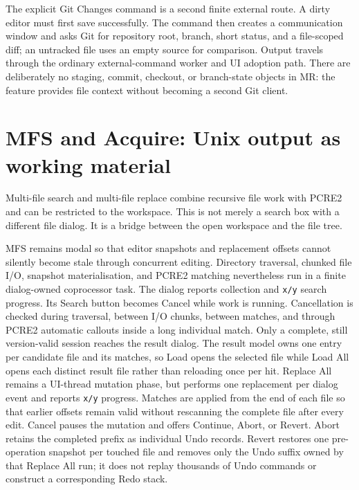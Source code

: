 \documentclass[a4paper,10pt,twoside,openany]{book}
\newcommand{\mr}{\textsc{MR}}
\begin{document}
The explicit Git Changes command is a second finite external route. A dirty
editor must first save successfully. The command then creates a communication
window and asks Git for repository root, branch, short status, and a
file-scoped diff; an untracked file uses an empty source for comparison.
Output travels through the ordinary external-command worker and UI adoption
path. There are deliberately no staging, commit, checkout, or branch-state
objects in \mr{}: the feature provides file context without becoming a second
Git client.

\chapter{MFS and Acquire: Unix output as working material}

Multi-file search and multi-file replace combine recursive file work with
PCRE2 and can be restricted to the workspace. This is not merely a search box
with a different file dialog. It is a bridge between the open workspace and
the file tree.

MFS remains modal so that editor snapshots and replacement offsets cannot
silently become stale through concurrent editing. Directory traversal, chunked
file I/O, snapshot materialisation, and PCRE2 matching nevertheless run in a
finite dialog-owned coprocessor task. The dialog reports collection and
\texttt{x/y} search progress. Its Search button becomes Cancel while work is
running. Cancellation is checked during traversal, between I/O chunks, between
matches, and through PCRE2 automatic callouts inside a long individual match.
Only a complete, still version-valid session reaches the result dialog.
The result model owns one entry per candidate file and its matches, so Load
opens the selected file while Load All opens each distinct result file rather
than reloading once per hit.
Replace All remains a UI-thread mutation phase, but performs one replacement
per dialog event and reports \texttt{x/y} progress. Matches are applied from
the end of each file so that earlier offsets remain valid without rescanning
the complete file after every edit. Cancel pauses the mutation and offers
Continue, Abort, or Revert. Abort retains the completed prefix as individual
Undo records. Revert restores one pre-operation snapshot per touched file and
removes only the Undo suffix owned by that Replace All run; it does not replay
thousands of Undo commands or construct a corresponding Redo stack.
\end{document}
